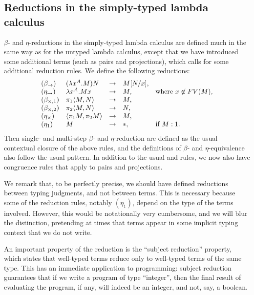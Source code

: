 \documentclass{article}
\begin{document}
\subsection{Reductions in the simply-typed lambda calculus}
\label{subsec-simply-reductions}

$\beta$- and $\eta$-reductions in the simply-typed lambda calculus are
defined much in the same way as for the untyped lambda calculus,
except that we have introduced some additional terms (such as pairs
and projections), which calls for some additional reduction rules. 
We define the following reductions:
\[ \begin{array}{lllll}\label{page-typed-reductions}
  (\beta_{\to}) & (\lambda x^{A}.M)N & \to & M[N/x], \\
  (\eta_{\to}) &  \lambda x^{A}.Mx & \to & M, & \mbox{where $x\not\in FV(M)$},\\
  (\beta_{\times,1}) & \pi_1\langle M,N\rangle & \to & M,\\
  (\beta_{\times,2}) & \pi_2\langle M,N\rangle & \to & N,\\
  (\eta_{\times}) & \langle\pi_1 M,\pi_2 M\rangle & \to & M,\\
  (\eta_{1}) & M & \to & {*}, & \mbox{if $M:1$}.
\end{array}
\]
Then single- and multi-step $\beta$- and $\eta$-reduction are defined
as the usual contextual closure of the above rules, and the
definitions of $\beta$- and $\eta$-equivalence also follow the usual
pattern. In addition to the usual {} and {\nrule{\xi}}
rules, we now also have congruence rules that apply to pairs and
projections. 

We remark that, to be perfectly precise, we should have defined
reductions between typing judgments, and not between terms. This is
necessary because some of the reduction rules, notably $(\eta_{1})$,
depend on the type of the terms involved. However, this would be
notationally very cumbersome, and we will blur the distinction,
pretending at times that terms appear in some implicit typing context
that we do not write. 

An important property of the reduction is the ``subject reduction''
property, which states that well-typed terms reduce only to well-typed
terms of the same type. This has an immediate application to
programming: subject reduction guarantees that if we write a program
of type ``integer'', then the final result of evaluating the program,
if any, will indeed be an integer, and not, say, a boolean. 
\end{document}
